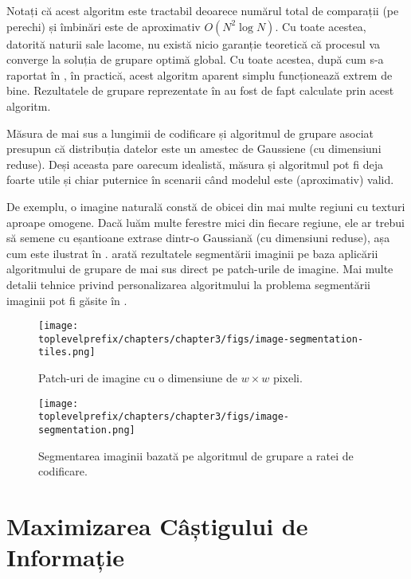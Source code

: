 \documentclass[../../book-main_ro.tex]{subfiles}
\begin{document}
Notați că acest algoritm este tractabil deoarece numărul total de comparații (pe perechi) și îmbinări este de aproximativ $O(N^2\log N)$. Cu toate acestea, datorită naturii sale lacome, nu există nicio garanție teoretică că procesul va converge la soluția de grupare optimă global. Cu toate acestea, după cum s-a raportat în \cite{ma2007segmentation}, în practică, acest algoritm aparent simplu funcționează extrem de bine. Rezultatele de grupare reprezentate în  au fost de fapt calculate prin acest algoritm.

\begin{example}\label{eg:image-segmentation} Măsura de mai sus a lungimii de codificare și algoritmul de grupare asociat presupun că distribuția datelor este un amestec de Gaussiene (cu dimensiuni reduse). Deși aceasta pare oarecum idealistă, măsura și algoritmul pot fi deja foarte utile și chiar puternice în scenarii când modelul este (aproximativ) valid.

	De exemplu, o imagine naturală constă de obicei din mai multe regiuni cu texturi aproape omogene. Dacă luăm multe ferestre mici din fiecare regiune, ele ar trebui să semene cu eșantioane extrase dintr-o Gaussiană (cu dimensiuni reduse), așa cum este ilustrat în .  arată rezultatele segmentării imaginii pe baza aplicării algoritmului de grupare de mai sus direct pe patch-urile de imagine. Mai multe detalii tehnice privind personalizarea algoritmului la problema segmentării imaginii pot fi găsite în \cite{Mobahi-IJCV2011}.
\end{example}

\begin{figure}
	\centering
	\texttt{[image: \\toplevelprefix/chapters/chapter3/figs/image-segmentation-tiles.png]}
	\caption{Patch-uri de imagine cu o dimensiune de $w\times w$ pixeli.}
	\label{fig:image-patch}
\end{figure}

\begin{figure}[th]
	\centering
	\texttt{[image: \\toplevelprefix/chapters/chapter3/figs/image-segmentation.png]}
	\caption{Segmentarea imaginii bazată pe algoritmul de grupare a ratei de codificare.}
	\label{fig:image-segmentation}
\end{figure}

\section{Maximizarea Câștigului de Informație}
\label{sec:chap4-representation-learning-problem}
\end{document}
